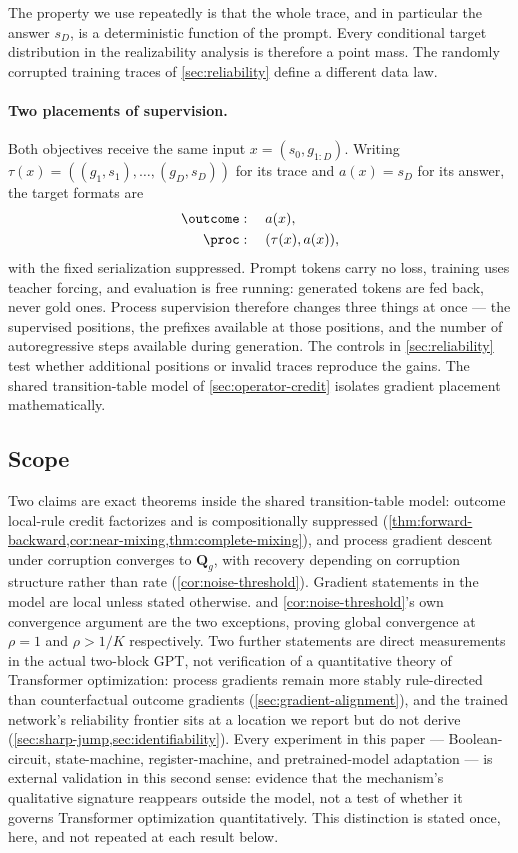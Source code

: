 The property we use repeatedly is that the whole trace, and in particular the
answer $s_D$, is a deterministic function of the prompt.  Every conditional
target distribution in the realizability analysis is therefore a point mass. The
randomly corrupted training traces of \cref{sec:reliability} define a different
data law.

\paragraph{Two placements of supervision.}
Both objectives receive the same input $x=(s_0,g_{1:D})$.  Writing
$\tau(x)=((g_1,s_1),\ldots,(g_D,s_D))$ for its trace and $a(x)=s_D$ for its
answer, the target formats are
\begin{align}
  \outcome &: \quad a(x),\label{eq:outcome-format}\\
  \proc &: \quad (\tau(x),a(x)),\label{eq:process-format}
\end{align}
with the fixed serialization suppressed.  Prompt tokens carry no loss, training
uses teacher forcing, and evaluation is free running: generated tokens are fed
back, never gold ones.  Process supervision therefore changes three things at
once --- the supervised positions, the prefixes available at those positions,
and the number of autoregressive steps available during generation.  The controls in \cref{sec:reliability} test whether additional positions or
invalid traces reproduce the gains. The shared transition-table model of
\cref{sec:operator-credit} isolates gradient placement mathematically.

\subsection{Scope}
\label{sec:scope}
Two claims are exact theorems inside the shared transition-table model:
outcome local-rule credit factorizes and is compositionally suppressed
(\cref{thm:forward-backward,cor:near-mixing,thm:complete-mixing}), and
process gradient descent under corruption converges to $\bm{Q}_g$, with
recovery depending on corruption structure rather than rate
(\cref{cor:noise-threshold}). Gradient statements in the model are local
unless stated otherwise.  and
\cref{cor:noise-threshold}'s own convergence argument are the two
exceptions, proving global convergence at $\rho=1$ and $\rho>1/K$
respectively. Two further statements are direct measurements in the
actual two-block GPT, not verification of a quantitative theory of
Transformer optimization: process gradients remain more stably
rule-directed than counterfactual outcome gradients
(\cref{sec:gradient-alignment}), and the trained network's reliability
frontier sits at a location we report but do not derive
(\cref{sec:sharp-jump,sec:identifiability}). Every experiment in this
paper --- Boolean-circuit, state-machine, register-machine, and
pretrained-model adaptation --- is external validation in this second
sense: evidence that the mechanism's qualitative signature reappears
outside the model, not a test of whether it governs Transformer
optimization quantitatively. This distinction is stated once, here, and
not repeated at each result below.

